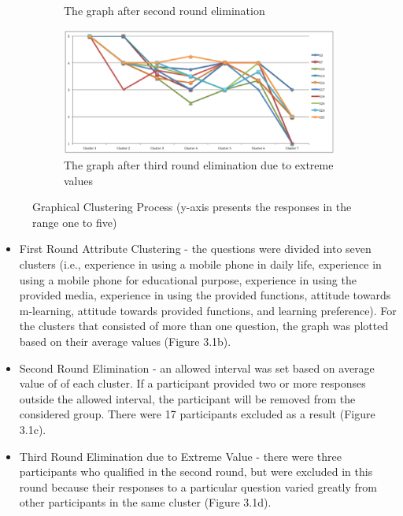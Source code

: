 \begin{figure}[!hbt]
\begin{subfigure}{0.49\textwidth}
        \caption{The graph after second round elimination}
    \end{subfigure}\hspace{0.01\textwidth}
\begin{subfigure}{0.49\textwidth}
        \includegraphics[width=\textwidth]{persona1d}
        \caption{The graph after third round elimination due to extreme values}
    \end{subfigure}
    \caption{Graphical Clustering Process (y-axis presents the responses in the range one to five)}
\end{figure}

\begin{itemize}
\item First Round Attribute Clustering - the questions were divided into seven clusters (i.e., experience in using a mobile phone in daily life, experience in using a mobile phone for educational purpose, experience in using the provided media, experience in using the provided functions, attitude towards m-learning, attitude towards provided functions, and learning preference). For the clusters that consisted of more than one question, the graph was plotted based on their average values (Figure 3.1b).

\item Second Round Elimination - an allowed interval was set based on average value of of each cluster. If a participant provided two or more responses outside the allowed interval, the participant will be removed from the considered group. There were 17 participants excluded as a result (Figure 3.1c). 

\item Third Round Elimination due to Extreme Value - there were three participants who qualified in the second round, but were excluded in this round because their responses to a particular question varied greatly from other participants in the same cluster (Figure 3.1d). 
\end{itemize}

